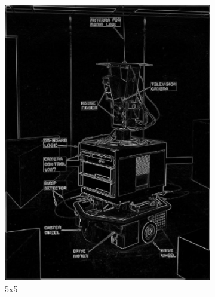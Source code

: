 \documentclass[lettersize,journal]{IEEEtran}
\begin{document}
\begin{figure}[h]
\begin{subfigure}[h]{0.115\textwidth}
        \includegraphics[width=\linewidth]{gaussian_edge_map_5x5_sigma_1}
        \caption{5x5}  
    \end{subfigure}
    \begin{subfigure}[h]{0.115\textwidth}
        \centering

\end{subfigure}
\end{figure}
\end{document}
